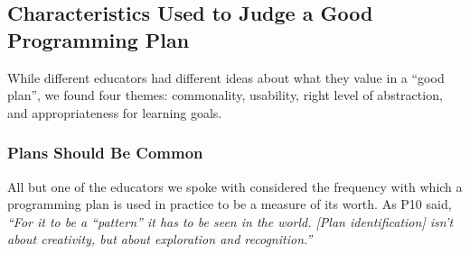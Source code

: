 

\subsection{Characteristics Used to Judge a Good Programming Plan}
\label{sec:judging}

While different educators had different ideas about what they value in a ``good plan'', we found four themes: commonality, usability, right level of abstraction, and appropriateness for learning goals.


\subsubsection{Plans Should Be Common}
\label{sec:commonality}
All but one of the educators we spoke with considered the frequency with which a programming plan is used in practice to be a measure of its worth. As P10 said, \textit{``For it to be a  ``pattern'' it has to be seen in the world. [Plan identification] isn't about creativity, but about exploration and recognition.''}






